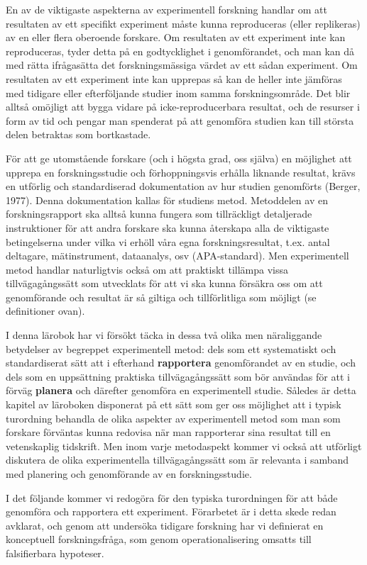\documentclass[
]{book}
\begin{document}
En av de viktigaste aspekterna av experimentell forskning handlar om att resultaten av ett specifikt experiment måste kunna reproduceras (eller replikeras) av en eller flera oberoende forskare. Om resultaten av ett experiment inte kan reproduceras, tyder detta på en godtycklighet i genomförandet, och man kan då med rätta ifrågasätta det forskningsmässiga värdet av ett sådan experiment. Om resultaten av ett experiment inte kan upprepas så kan de heller inte jämföras med tidigare eller efterföljande studier inom samma forskningsområde. Det blir alltså omöjligt att bygga vidare på icke-reproducerbara resultat, och de resurser i form av tid och pengar man spenderat på att genomföra studien kan till största delen betraktas som bortkastade.

För att ge utomstående forskare (och i högsta grad, oss själva) en möjlighet att upprepa en forskningsstudie och förhoppningsvis erhålla liknande resultat, krävs en utförlig och standardiserad dokumentation av hur studien genomförts (Berger, 1977). Denna dokumentation kallas för studiens metod. Metoddelen av en forskningsrapport ska alltså kunna fungera som tillräckligt detaljerade instruktioner för att andra forskare ska kunna återskapa alla de viktigaste betingelserna under vilka vi erhöll våra egna forskningsresultat, t.ex. antal deltagare, mätinstrument, dataanalys, osv (APA-standard). Men experimentell metod handlar naturligtvis också om att praktiskt tillämpa vissa tillvägagångssätt som utvecklats för att vi ska kunna försäkra oss om att genomförande och resultat är så giltiga och tillförlitliga som möjligt (se definitioner ovan).

I denna lärobok har vi försökt täcka in dessa två olika men näraliggande betydelser av begreppet experimentell metod: dels som ett systematiskt och standardiserat sätt att i efterhand \textbf{rapportera} genomförandet av en studie, och dels som en uppsättning praktiska tillvägagångssätt som bör användas för att i förväg \textbf{planera} och därefter genomföra en experimentell studie. Således är detta kapitel av läroboken disponerat på ett sätt som ger oss möjlighet att i typisk turordning behandla de olika aspekter av experimentell metod som man som forskare förväntas kunna redovisa när man rapporterar sina resultat till en vetenskaplig tidskrift. Men inom varje metodaspekt kommer vi också att utförligt diskutera de olika experimentella tillvägagångssätt som är relevanta i samband med planering och genomförande av en forskningsstudie.

I det följande kommer vi redogöra för den typiska turordningen för att både genomföra och rapportera ett experiment. Förarbetet är i detta skede redan avklarat, och genom att undersöka tidigare forskning har vi definierat en konceptuell forskningsfråga, som genom operationalisering omsatts till falsifierbara hypoteser.
\end{document}
